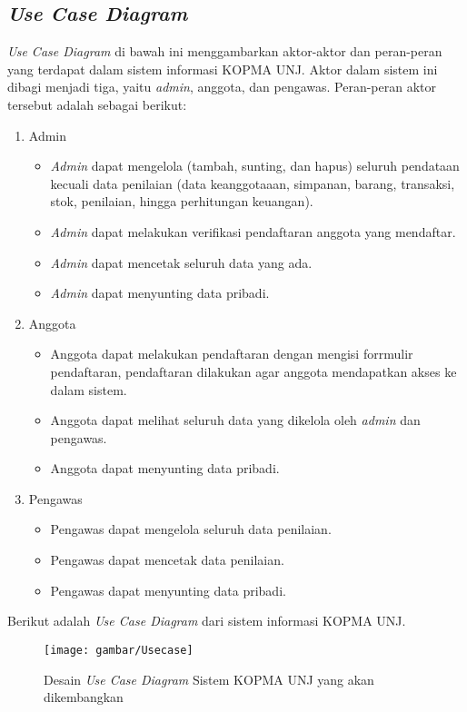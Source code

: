 \subsection{\emph{Use Case Diagram}}
\emph{Use Case Diagram} di bawah ini menggambarkan aktor-aktor dan peran-peran yang terdapat dalam sistem informasi KOPMA UNJ. Aktor dalam sistem ini dibagi menjadi tiga, yaitu \textit{admin}, anggota, dan pengawas. Peran-peran aktor tersebut adalah sebagai berikut:
\begin{enumerate}
	\item Admin	
\begin{itemize}
	\item \emph{Admin} dapat mengelola (tambah, sunting, dan hapus) seluruh pendataan kecuali data penilaian (data keanggotaaan, simpanan, barang, transaksi, stok, penilaian, hingga perhitungan keuangan).
	\item \emph{Admin} dapat melakukan verifikasi pendaftaran anggota yang mendaftar.
	\item \emph{Admin} dapat mencetak seluruh data yang ada.
	\item \emph{Admin} dapat menyunting data pribadi.
\end{itemize}	
	\item Anggota
	\begin{itemize}
	\item Anggota dapat melakukan pendaftaran dengan mengisi forrmulir pendaftaran, pendaftaran dilakukan agar anggota mendapatkan akses ke dalam sistem.
	\item Anggota dapat melihat seluruh data yang dikelola oleh \emph{admin} dan pengawas.
	\item Anggota dapat menyunting data pribadi.
	\end{itemize}		
	\item Pengawas
	\begin{itemize}
	\item Pengawas dapat mengelola seluruh data penilaian.
	\item Pengawas dapat mencetak data penilaian.
	\item Pengawas dapat menyunting data pribadi.	
	\end{itemize}	
\end{enumerate}	

Berikut adalah \emph{Use Case Diagram} dari sistem informasi KOPMA UNJ.

\begin{figure}[H]
	\centering
	\texttt{[image: gambar/Usecase]}
	\caption{Desain \emph{Use Case Diagram} Sistem KOPMA UNJ yang akan dikembangkan}
\end{figure}

